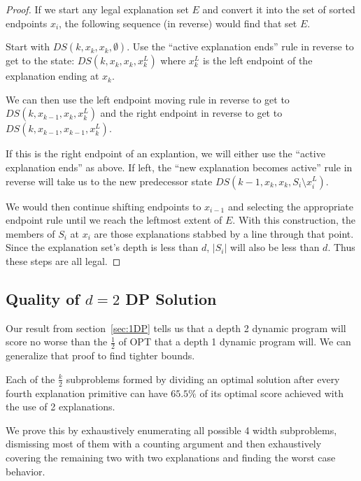 \documentclass[11pt,twocolumn]{article}
\begin{document}
\begin{proof}
If we start any legal explanation set $E$ and convert it into the set of sorted endpoints $x_i$, the following sequence (in reverse) would find that set $E$.  

Start with $DS(k,x_k,x_k,\emptyset)$.  Use the ``active explanation ends'' rule  in reverse to get to the state: $DS(k,x_k,x_k,{x^L_k})$ where $x^L_k$ is the left endpoint of the explanation ending at $x_k$.

We can then use the left endpoint moving rule in reverse to get to $DS(k,x_{k-1},x_k,{x^L_k})$ and the right endpoint in reverse to get to $DS(k,x_{k-1},x_{k-1},{x^L_k})$.

If this is the right endpoint of an explantion, we will either use the ``active explanation ends'' as above.  If left, the ``new explanation becomes active'' rule in reverse will take us to the new predecessor state $DS(k-1,x_k,x_k,S_i \setminus{x^L_i} )$.

We would then continue shifting endpoints to $x_{i-1}$ and selecting the appropriate endpoint rule until we reach the leftmost extent of $E$.  With this construction, the members of $S_i$ at $x_i$ are those explanations stabbed by a line through that point.  Since the explanation set's depth is less than $d$, $|S_i|$ will also be less than $d$.  Thus these steps are all legal.
\end{proof}

\subsection{Quality of $d=2$ DP Solution}

Our result from section~\ref{sec:1DP} tells us that a depth 2 dynamic program will score no worse than the $\frac12$ of OPT that a depth 1 dynamic program will.  We can generalize that proof to find tighter bounds.

\begin{lem} \label{lem:2DP2/3}
Each of the $\frac{k}{2}$ subproblems formed by dividing an optimal solution after every fourth explanation primitive can have $65.5\%$ of its optimal score achieved with the use of 2 explanations.
\end{lem}

We prove this by exhaustively enumerating all possible 4 width subproblems, dismissing most of them with a counting argument and then exhaustively covering the remaining two with two explanations and finding the worst case behavior.
\end{document}
